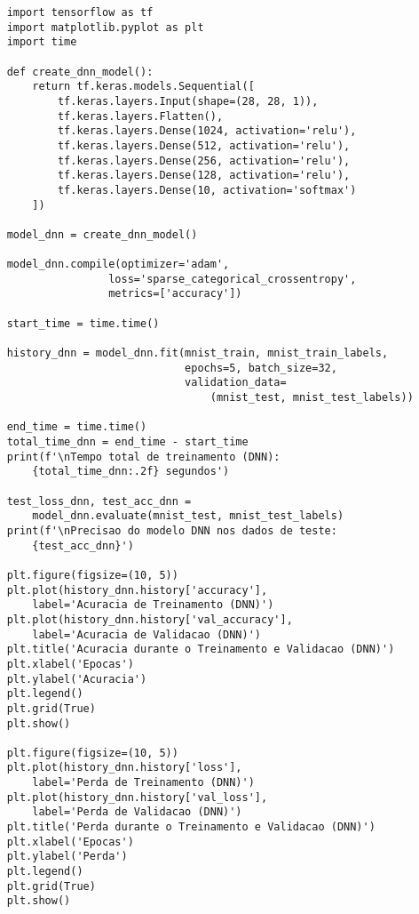 \begin{lstlisting}
    import tensorflow as tf
    import matplotlib.pyplot as plt
    import time

    def create_dnn_model():
        return tf.keras.models.Sequential([
            tf.keras.layers.Input(shape=(28, 28, 1)),
            tf.keras.layers.Flatten(),
            tf.keras.layers.Dense(1024, activation='relu'),
            tf.keras.layers.Dense(512, activation='relu'),
            tf.keras.layers.Dense(256, activation='relu'),
            tf.keras.layers.Dense(128, activation='relu'),
            tf.keras.layers.Dense(10, activation='softmax')
        ])

    model_dnn = create_dnn_model()

    model_dnn.compile(optimizer='adam',
                    loss='sparse_categorical_crossentropy',
                    metrics=['accuracy'])

    start_time = time.time()

    history_dnn = model_dnn.fit(mnist_train, mnist_train_labels,
                                epochs=5, batch_size=32,
                                validation_data=
                                    (mnist_test, mnist_test_labels))

    end_time = time.time()
    total_time_dnn = end_time - start_time
    print(f'\nTempo total de treinamento (DNN): 
        {total_time_dnn:.2f} segundos')

    test_loss_dnn, test_acc_dnn = 
        model_dnn.evaluate(mnist_test, mnist_test_labels)
    print(f'\nPrecisao do modelo DNN nos dados de teste: 
        {test_acc_dnn}')

    plt.figure(figsize=(10, 5))
    plt.plot(history_dnn.history['accuracy'], 
        label='Acuracia de Treinamento (DNN)')
    plt.plot(history_dnn.history['val_accuracy'], 
        label='Acuracia de Validacao (DNN)')
    plt.title('Acuracia durante o Treinamento e Validacao (DNN)')
    plt.xlabel('Epocas')
    plt.ylabel('Acuracia')
    plt.legend()
    plt.grid(True)
    plt.show()

    plt.figure(figsize=(10, 5))
    plt.plot(history_dnn.history['loss'], 
        label='Perda de Treinamento (DNN)')
    plt.plot(history_dnn.history['val_loss'], 
        label='Perda de Validacao (DNN)')
    plt.title('Perda durante o Treinamento e Validacao (DNN)')
    plt.xlabel('Epocas')
    plt.ylabel('Perda')
    plt.legend()
    plt.grid(True)
    plt.show()
\end{lstlisting}
    

